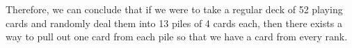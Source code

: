\documentclass[answers]{exam}
\begin{document}
\begin{questions}
\begin{solution}
      Therefore, we can conclude that if we were to 
      take a regular deck of 52 playing cards and randomly deal them into 13 
      piles of 4 cards each, then there exists a way to pull out one card
      from each pile so that we have a card from every rank.
    \end{solution}
\end{questions}

% 
% 
\end{document}
